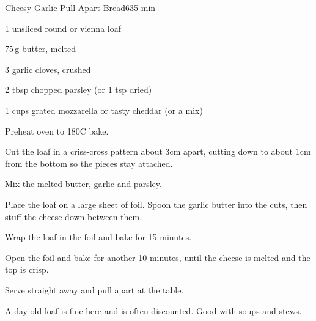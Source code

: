 \begin{recipebox}{Cheesy Garlic Pull-Apart Bread}{6}{35 min}
\begin{ingredients}
  \item 1 unsliced round or vienna loaf
  \item 75\,g butter, melted
  \item 3 garlic cloves, crushed
  \item 2 tbsp chopped parsley (or 1 tsp dried)
  \item 1 cups grated mozzarella or tasty cheddar (or a mix)
\end{ingredients}

\begin{method}
  \item Preheat oven to 180\degree C bake.
  \item Cut the loaf in a criss-cross pattern about 3cm apart, cutting down to about 1cm from the bottom so the pieces stay attached.
  \item Mix the melted butter, garlic and parsley.
  \item Place the loaf on a large sheet of foil. Spoon the garlic butter into the cuts, then stuff the cheese down between them.
  \item Wrap the loaf in the foil and bake for 15 minutes.
  \item Open the foil and bake for another 10 minutes, until the cheese is melted and the top is crisp.
  \item Serve straight away and pull apart at the table.
\end{method}

\begin{notes}
A day-old loaf is fine here and is often discounted. Good with soups and stews.
\end{notes}
\end{recipebox}
